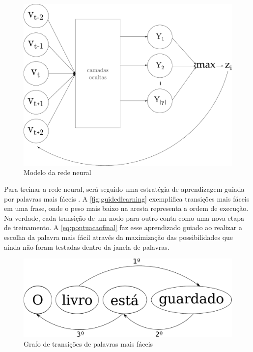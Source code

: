 \begin{figure}[htb]
    \caption{Modelo da rede neural}\label{fig:neuralnetworkfinal}
    \begin{center}
        \includegraphics[scale=0.4]{img/neuralnetworkfinal.pdf}
    \end{center}
\end{figure}

Para treinar a rede neural, será seguido uma estratégia de aprendizagem guiada por palavras mais fáceis \cite{shen2007guided}. A \autoref{fig:guidedlearning} exemplifica transições mais fáceis em uma frase, onde o peso mais baixo na aresta representa a ordem de execução. Na verdade, cada transição de um nodo para outro conta como uma nova etapa de treinamento. A \autoref{eq:pontuacaofinal} faz esse aprendizado guiado ao realizar a escolha da palavra mais fácil através da maximização das possibilidades que ainda não foram testadas dentro da janela de palavras.

\begin{figure}[htb]
	  \caption{Grafo de transições de palavras mais fáceis}\label{fig:guidedlearning}
	  \begin{center}
	      \includegraphics[scale=0.3]{img/guidedlearning.pdf}
	  \end{center}
\end{figure}

